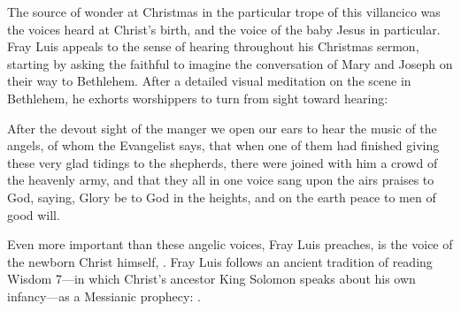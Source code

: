 The source of wonder at Christmas in the particular trope of this villancico was
the voices heard at Christ's birth, and the voice of the baby Jesus in
particular.
Fray Luis appeals to the sense of hearing throughout his Christmas sermon,
starting by asking the faithful to imagine the conversation of Mary and Joseph
on their way to Bethlehem.
After a detailed visual meditation on the scene in Bethlehem, he exhorts
worshippers to turn from sight toward hearing:
\begin{quoting}
    After the devout sight of the manger we open our ears to hear the music of
    the angels, of whom the Evangelist says, that when one of them had finished
    giving these very glad tidings to the shepherds, there were joined with him
    a crowd of the heavenly army, and that they all in one voice sang upon the
    airs praises to God, saying, Glory be to God in the heights, and on the
    earth peace to men of good will.%
        \Autocite
        [40: .]
        {LuisdeGranada:Xmas}
\end{quoting}
Even more important than these angelic voices, Fray Luis preaches, is the voice
of the newborn Christ himself, .
Fray Luis follows an ancient tradition of reading Wisdom 7---in which Christ's
ancestor King Solomon speaks about his own infancy---as a Messianic prophecy:
.%
    \Autocites
    [37--38: ]
    {LuisdeGranada:Xmas}
    [Cf.] [670, on .]
    {Lapide:Gospels19C}

